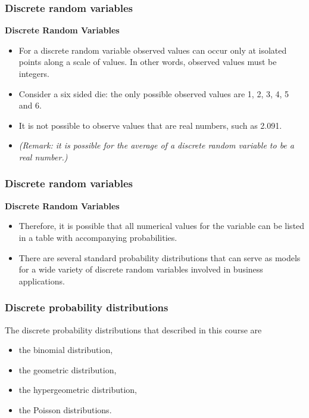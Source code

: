 \documentclass[IntroMain.tex]{subfiles}
\begin{document}
\begin{frame}
\frametitle{Discrete random variables}
\Large
\vspace{-0.7cm}
\textbf{Discrete Random Variables}
\begin{itemize}
\item For a discrete random variable observed values can occur only at isolated points along a scale of values. In other words, observed values must be integers.
\item Consider a six sided die: the only possible observed values are 1, 2, 3, 4, 5 and 6. 
\item It is not possible to observe values that are real numbers, such as 2.091.
\large
\item \textit{(Remark: it is possible for the average of a discrete random variable to be a real number.)}
\end{itemize}
\end{frame}
\begin{frame}
\frametitle{Discrete random variables}
\Large
\vspace{-1cm}
\textbf{Discrete Random Variables}
\begin{itemize}
\item Therefore, it is possible that all numerical values for the variable can be listed in a table with accompanying
probabilities. 
\item
There are several standard probability distributions that can serve as models for a wide variety of discrete random variables involved in business applications. 
\end{itemize}
\end{frame}
\begin{frame}
\frametitle{Discrete probability distributions}
\Large
\vspace{-1cm}
The discrete probability distributions that described in this course are
\begin{itemize}
\item the binomial distribution, 
\item the geometric distribution,
\item the hypergeometric distribution, 
\item the Poisson distributions.
\end{itemize}
\end{frame}

\end{document}
